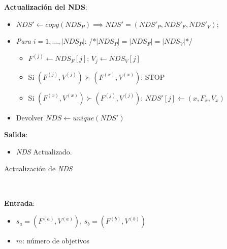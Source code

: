 \begin{itemize}
\begin{center}
\begin{minipage}[H]{0.8\linewidth}
\begin{algorithm}[H]
 \textbf{Actualización del NDS}:\\
        \begin{itemize}
        	\vspace{0.15cm}\item $NDS' \gets copy(NDS_P) \implies NDS'=(NDS'_P, NDS'_F, NDS'_V)$;
        	\vspace{0.15cm}\item \textit{Para $i=1, \dots, |NDS_P|$}:  \hspace{2.5cm} /*{\scriptsize $|NDS_P|=|NDS_F|=|NDS_V|$}*/
        	\begin{itemize}
        		\vspace{0.15cm}\item $F^{(j)} \gets NDS_F[j]$;  $V_j \gets NDS_V[j]$
            	\vspace{0.15cm}\item Si $(F^{(j)},V^{(j)}) \succ (F^{(x)}, V^{(x)})$: STOP
            	\vspace{0.15cm}\item Si $(F^{(x)}, V^{(x)}) \succ (F^{(j)},V^{(j)})$: $NDS'[j] \gets (x, F_x, V_x)$
        	\end{itemize}
        	\vspace{0.15cm}\item Devolver $NDS \gets unique(NDS')$
        \end{itemize}
    \vspace{0.3cm} 
    
    \textbf{Salida}:
    \begin{itemize}
        \item \textit{NDS} Actualizado.
    \end{itemize}
 \caption{Actualización de \textit{NDS}}
 \label{alg:2}
\end{algorithm}
\end{minipage} \\
\begin{minipage}[H]{0.8\linewidth}
    \begin{algorithm}[H]
\SetAlgoLined
 \textbf{Entrada}:
 \begin{itemize}
 
    \vspace{0.15cm}\item $s_a = (F^{(a)}, V^{(a)})$, $s_b = (F^{(b)}, V^{(b)})$
    \vspace{0.15cm}\item $m$: número de objetivos
 \end{itemize}
 

\end{algorithm}
\end{minipage}
\end{center}
\end{itemize}
